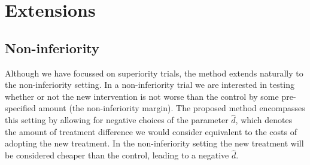\documentclass[sagev, Crown]{sagej}
\begin{document}






\section{Extensions}\label{sec:extensions}

\subsection{Non-inferiority}

Although we have focussed on superiority trials, the method extends naturally to the non-inferiority setting. In a non-inferiority trial we are interested in testing whether or not the new intervention is not worse than the control by some pre-specified amount (the non-inferiority margin). The proposed method encompasses this setting by allowing for negative choices of the parameter $\hat{d}$, which denotes the amount of treatment difference we would consider equivalent to the costs of adopting the new treatment. In the non-inferiority setting the new treatment will be considered cheaper than the control, leading to a negative $\hat{d}$.
\end{document}
